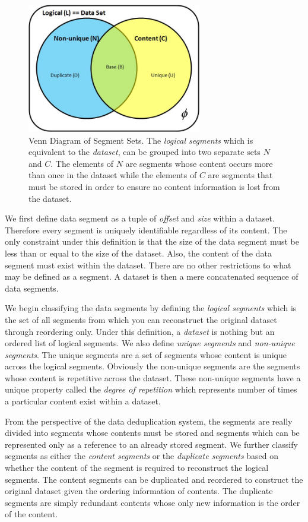 \begin{figure}[!t]
\centering
\includegraphics[width=3in]{figure/dedup/seg_classification.jpg}
\caption{Venn Diagram of Segment Sets. The \emph{logical segments} which is equivalent to the \emph{dataset}, can be grouped into two separate sets $N$ and $C$. The elements of $N$ are segments whose content occurs more than once in the dataset while the elements of $C$ are segments that must be stored in order to ensure no content information is lost from the dataset.}
\label{seg_class}
\end{figure}

We first define data segment as a tuple of \emph{offset} and \emph{size} within a dataset. Therefore every segment is uniquely identifiable regardless of its content. The only constraint under this definition is that the size of the data segment must be less than or equal to the size of the dataset. Also, the content of the data segment must exist within the dataset. There are no other restrictions to what may be defined as a segment. A dataset is then a mere concatenated sequence of data segments.

We begin classifying the data segments by defining the \emph{logical segments} which is the set of all segments from which you can reconstruct the original dataset through reordering only. Under this definition, a \emph{dataset} is nothing but an ordered list of logical segments. We also define \emph{unique segments} and \emph{non-unique segments}. The unique segments are a set of segments whose content is unique across the logical segments. Obviously the non-unique segments are the segments whose content is repetitive across the dataset. These non-unique segments have a unique property called the \emph{degree of repetition} which represents number of  times a particular content exist within a dataset.

From the perspective of the data deduplication system, the segments are really divided into segments whose contents must be stored and segments which can be represented only as a reference to an already stored segment. We further classify segments as either the \emph{content segments} or the \emph{duplicate segments} based on whether the content of the segment is required to reconstruct the logical segments. The content segments can be duplicated and reordered to construct the original dataset given the ordering information of contents. The duplicate segments are simply redundant contents whose only new information is the order of the content.

